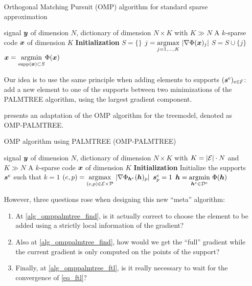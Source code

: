 \begin{algorithm}[!ht]
    \caption{Orthogonal Matching Pursuit (OMP) algorithm for standard sparse approximation}\label{alg_omp}
  \begin{algorithmic}[1]
    \Input signal $\bm{y}$ of dimension $N$, dictionary of dimension $N \times K$ with $K \gg N$
    \Output A $k$-sparse code $\bm{x}$ of dimension $K$
    \State \textbf{Initialization} $S=\{\}$
      \State $j =  \underset{j = 1,\dots,K}{\operatorname*{\arg\!\max}}~| \nabla \Phi(\bm{x})_j |$\label{alg_omp_pick_correlation}
      \State $S = S \cup \{j\}$
      \State $\bm{x} = \underset{\text{supp}(\bm{x}) \subset S}{\operatorname{argmin}} \Phi(\bm{x})$
    \EndFor
  \end{algorithmic}
\end{algorithm}

Our idea is to use the same principle when adding elements to supports $(\bm{s}^e)_{e \in \mathcal E}$: add a new element to one of the supports between two minimizations of the \ac{PALMTREE} algorithm, using the largest gradient component.

\noindent
{} presents an adaptation of the \ac{OMP} algorithm for the \gls{treemodel}, denoted as OMP-PALMTREE.

\begin{algorithm}[!ht]
    \caption{\ac{OMP} algorithm using \ac{PALMTREE} (OMP-PALMTREE)}\label{alg_omppalmtree}
  \begin{algorithmic}[1]
    \Input signal $\bm{y}$ of dimension $N$, dictionary of dimension $N \times K$ with $K = |\mathcal E| \cdot N$ and $K \gg N$
    \Output A $k$-sparse code $\bm{x}$ of dimension $K$
    \State \textbf{Initialization} Initialize the supports $\bm{s}^e$ such that $k=1$
      \State $(e,p) = \underset{(e,p) \in \mathcal E \times \mathcal P}{\operatorname*{\arg\!\max}}~ |\nabla \Phi_{\bm{h}^e}(\bm{h})_p|$\label{alg_omppalmtree_find}
      \State $\bm{s}^e_p = 1$
      \State $\bm{h} = \underset{\bm{h}^e \in {\mathcal D}^e}{\operatorname{argmin}}~ \Phi(\bm{h})$ \label{alg_omppalmtree_ftl}
    \EndFor
  \end{algorithmic}
\end{algorithm}

\noindent
However, three questions rose when designing this new “meta” algorithm:
\begin{enumerate}[label={\alph*)},noitemsep]
	\item At \cref{alg_omppalmtree_find}, is it actually correct to choose the element to be added using a strictly local information of the gradient?
	\item Also at \cref{alg_omppalmtree_find}, how would we get the “full” gradient while the current gradient is only computed on the points of the support?
	\item Finally, at \cref{alg_omppalmtree_ftl}, is it really necessary to wait for the convergence of \eqref{eq_ftl}?
\end{enumerate}

